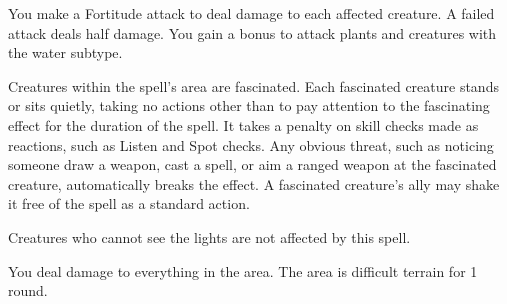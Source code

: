\begin{spelleffect}
    You make a Fortitude attack to deal damage to each affected creature. A failed attack deals half damage. You gain a  bonus to attack plants and creatures with the water subtype. 
\end{spelleffect}

\spelldur{\durshort}
\begin{spelleffect}
    Creatures within the spell's area are fascinated. Each fascinated creature stands or sits quietly, taking no actions other than to pay attention to the fascinating effect for the duration of the spell. It takes a  penalty on skill checks made as reactions, such as Listen and Spot checks. Any obvious threat, such as noticing someone draw a weapon, cast a spell, or aim a ranged weapon at the fascinated creature, automatically breaks the effect. A fascinated creature's ally may shake it free of the spell as a standard action.
\end{spelleffect}
\begin{spellnotes}
    Creatures who cannot see the lights are not affected by this spell.
\end{spellnotes}

\begin{comment}
\subsubsection{I}
\end{comment}

\begin{spelleffect}
    You deal damage to everything in the area. The area is difficult terrain for 1 round.
\end{spelleffect}

